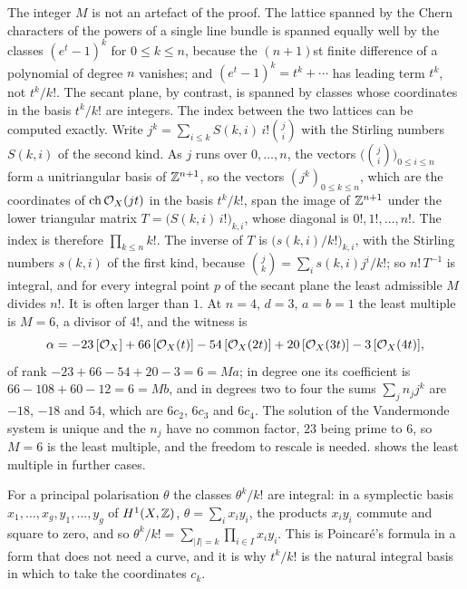 \begin{remark}%
\label{rem:themultiple}
The integer $M$ is not an artefact of the proof. The lattice spanned by the
Chern characters of the powers of a single line bundle is spanned equally well
by the classes $(e^{t}-1)^{k}$ for $0\le k\le n$, because the $(n+1)$st finite
difference of a polynomial of degree $n$ vanishes; and $(e^{t}-1)^{k}=t^{k}+
\cdots$ has leading term $t^{k}$, not $t^{k}/k!$. The secant plane, by
contrast, is spanned by classes whose coordinates in the basis $t^{k}/k!$ are
integers. The index between the two lattices can be computed exactly. Write
$j^{k}=\sum_{i\le k}S(k,i)\,i!\binom{j}{i}$ with the Stirling numbers $S(k,i)$
of the second kind. As $j$ runs over $0,\dots,n$, the vectors
$\bigl(\binom{j}{i}\bigr)_{0\le i\le n}$ form a unitriangular basis of
$\mathbb{Z}^{n+1}$, so the vectors $(j^{k})_{0\le k\le n}$, which are the coordinates
of $\operatorname{ch}\mathcal{O}_{X}(jt)$ in the basis $t^{k}/k!$, span the image of $\mathbb{Z}^{n+1}$
under the lower triangular matrix $T=\bigl(S(k,i)\,i!\bigr)_{k,i}$, whose
diagonal is $0!,1!,\dots,n!$. The index is therefore $\prod_{k\le n}k!$. The
inverse of $T$ is $\bigl(s(k,i)/k!\bigr)_{k,i}$, with the Stirling numbers
$s(k,i)$ of the first kind, because $\binom{j}{k}=\sum_{i}s(k,i)j^{i}/k!$;
so $n!\,T^{-1}$ is integral, and for every integral point $p$ of the secant
plane the least admissible $M$ divides $n!$. It is often larger than $1$. At $n=4$, $d=3$, $a=b=1$ the least multiple is $M=6$,
a divisor of $4!$, and the witness is
\[
  \alpha=-23\,[\mathcal{O}_{X}]+66\,[\mathcal{O}_{X}(t)]-54\,[\mathcal{O}_{X}(2t)]
         +20\,[\mathcal{O}_{X}(3t)]-3\,[\mathcal{O}_{X}(4t)],
\]
of rank $-23+66-54+20-3=6=Ma$; in degree one its coefficient is
$66-108+60-12=6=Mb$, and in degrees two to four the sums
$\sum_{j}n_{j}j^{k}$ are $-18$, $-18$ and $54$, which are $6c_{2}$, $6c_{3}$ and
$6c_{4}$. The solution of the Vandermonde system is unique and the $n_{j}$
have no common factor, $23$ being prime to $6$, so $M=6$ is the least
multiple, and the freedom to rescale is needed.  shows
the least multiple in further cases.

For a principal polarisation $\theta$ the classes $\theta^{k}/k!$ are
integral: in a symplectic basis $x_{1},\dots,x_{g},y_{1},\dots,y_{g}$ of
$H^{1}(X,\mathbb{Z})$, $\theta=\sum_{i}x_{i}y_{i}$, the products $x_{i}y_{i}$
commute and square to zero, and so
$\theta^{k}/k!=\sum_{|I|=k}\prod_{i\in I}x_{i}y_{i}$. This is Poincar\'e's
formula in a form that does not need a curve, and it is why $t^{k}/k!$ is the
natural integral basis in which to take the coordinates $c_{k}$.
\end{remark}

